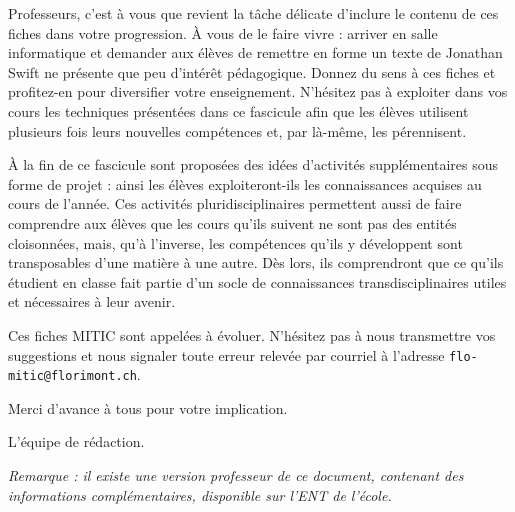 \vspace{18pt}

Professeurs, c'est à vous que revient la tâche délicate d'inclure le contenu de ces fiches dans votre progression. À vous de le faire vivre : arriver en salle informatique et demander aux élèves de remettre en forme un texte de Jonathan Swift ne présente que peu d'intérêt pédagogique. Donnez du sens à ces fiches et profitez-en pour diversifier votre enseignement. N'hésitez pas à exploiter dans vos cours les techniques présentées dans ce fascicule afin que les élèves utilisent plusieurs fois leurs nouvelles compétences et, par là-même, les pérennisent.

\vspace{18pt}

À la fin de ce fascicule sont proposées des idées d'activités supplémentaires sous forme de projet : ainsi les élèves exploiteront-ils les connaissances acquises au cours de l'année. Ces activités pluridisciplinaires permettent aussi de faire comprendre aux élèves que les cours qu'ils suivent ne sont pas des entités cloisonnées, mais, qu'à l'inverse, les compétences qu'ils y développent sont transposables d'une matière à une autre. Dès lors, ils comprendront que ce qu'ils étudient en classe fait partie d’un socle de connaissances transdisciplinaires utiles et nécessaires à leur avenir.

\vspace{18pt}

Ces fiches MITIC sont appelées à évoluer. N'hésitez pas à nous transmettre vos suggestions et nous signaler toute erreur relevée par courriel à l'adresse \texttt{flo-mitic@florimont.ch}.

\vspace{18pt}

Merci d'avance à tous pour votre implication.

\vspace{18pt}

L'équipe de rédaction.

\vspace{2cm}

\emph{Remarque : il existe une version professeur de ce document, contenant des informations complémentaires, disponible sur l'ENT de l'école.}

  
